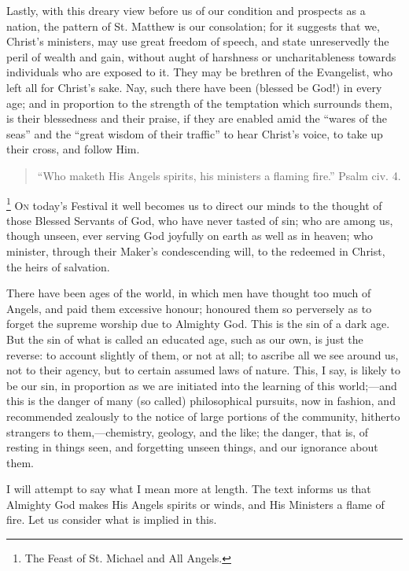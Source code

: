Lastly, with this dreary view before us of our condition and
prospects as a nation, the pattern of St. Matthew is our consolation;
for it suggests that we, Christ's ministers, may use great freedom of
speech, and state unreservedly the peril of wealth and gain, without
aught of harshness or uncharitableness towards individuals who are
exposed to it. They may be brethren of the Evangelist, who left all for
Christ's sake. Nay, such there have been (blessed be God!) in every age;
and in proportion to the strength of the temptation which surrounds
them, is their blessedness and their praise, if they are enabled amid
the ``wares of the seas'' and the ``great wisdom of their
traffic'' to hear Christ's voice, to take up their cross, and follow
Him.


\begin{quote}

``Who maketh His Angels spirits, his ministers a flaming
fire.'' Psalm civ. 4.

\end{quote}

\footnote{The Feast of St. Michael and All Angels.} O\textsc{n} today's Festival it
well becomes us to direct our minds to the thought of those Blessed
Servants of God, who have never tasted of sin; who are among us, though
unseen, ever serving God joyfully on earth as well as in heaven; who
minister, through their Maker's condescending will, to the redeemed in
Christ, the heirs of salvation.

There have been ages of the world, in which men have thought too much
of Angels, and paid them excessive honour; honoured them so perversely
as to forget the supreme worship due to Almighty God. This is the sin of
a dark age. But the sin of what is called an educated age, such as our
own, is just the reverse: to account slightly of them, or not at all; to
ascribe all we see around us, not to their agency, but to certain
assumed laws of nature. This, I say, is likely to be our sin, in
proportion as we are initiated into the learning of this world;—and this
is the danger of many (so called) philosophical pursuits, now in
fashion, and recommended zealously to the notice of large portions of
the community, hitherto strangers to them,—chemistry, geology, and the
like; the danger, that is, of resting in things seen, and forgetting
unseen things, and our ignorance about them.

I will attempt to say what I mean more at length. The text informs us
that Almighty God makes His Angels spirits or winds, and His Ministers a
flame of fire. Let us consider what is implied in this.

